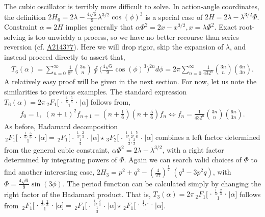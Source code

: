 \documentclass[nofootinbib,preprint]{revtex4-1}
\newcommand{\tFoIn}[3]{\,_2F_1 \Big[ 
\genfrac..{0pt}{}{#1}{#2}\Big| #3 \Big]}
\begin{document}
The cubic oscillator is terribly more difficult to solve. In action-angle coordinates, the 
definition $2H_6= 2\lambda -\frac{4\sqrt{6}}{9}\lambda^{3/2} \cos(\phi)^3$  is a 
special case of $2H= 2\lambda -\lambda^{3/2}\Phi$. Constraint $\alpha=2H$ implies generally 
that $\alpha \Phi^2 = 2x - x^{3/2}, x=\lambda\Phi^2$. Exact root-solving is too unwieldy 
a process, so we have no better recourse than series reversion 
(cf. \href{https://oeis.org/A214377}{A214377}). Here we will drop rigor, 
skip the expansion of $\lambda$, and instead proceed directly to assert that,
\begin{eqnarray}
T_6(\alpha)=  \sum_{n=0}^{\infty}\frac{1}{8^n}\binom{3n}{n}\oint\bigg(\frac{4\sqrt{6}}{9} \cos(\phi)^3 \bigg)^{2n} d\phi
= 2\pi \sum_{n=0}^{\infty}\frac{1}{432^{n}}\binom{3n}{n}\binom{6n}{3n}. \nonumber 
\end{eqnarray}
A relatively easy proof will be given in the next section. For now, let us note the similarities
to previous examples. The standard expression $T_6(\alpha) = 2\pi\tFoIn{\frac{1}{6},\frac{5}{6}}{1}{\alpha}$ 
follows from, 
\begin{eqnarray}
f_0=1, \; (n+1)^2 f_{n+1} = (n+\tfrac{1}{6})(n+\tfrac{5}{6})f_n
\iff f_n = \frac{1}{432^{n}}\binom{3n}{n}\binom{6n}{3n}.\nonumber 
\end{eqnarray}
As before, Hadamard decomposition
$\tFoIn{\frac{1}{6},\frac{5}{6}}{1}{\alpha}=
\tFoIn{\frac{1}{3},\frac{2}{3}}{\frac{1}{2}}{\alpha}
\star \,_3F_2 \Big[ 
\genfrac..{0pt}{}{\frac{1}{6},\frac{1}{2},\frac{5}{6}}{\frac{1}{3},\frac{2}{3}}\Big| \alpha \Big]$
combines a left factor determined from the general cubic constraint, $\alpha \Phi^2=2\lambda -\lambda^{3/2}$,
with a right factor determined by integrating powers of $\Phi$. Again we can search valid
choices of $\Phi$ to find another interesting case, $2H_3=p^2+q^2-(\frac{4}{27})^{\frac{1}{2}} \; ( q^3-3 p^2 q)$,
with $\Phi=\frac{4\sqrt{6}}{9}\sin(3\phi)$. The period function can be calculated simply by changing 
the right factor of the Hadamard product. That is,  
$T_3(\alpha)=2\pi\tFoIn{\frac{1}{3},\frac{2}{3}}{1}{\alpha}$ follows from 
$\tFoIn{\frac{1}{3},\frac{2}{3}}{1}{\alpha}=
\tFoIn{\frac{1}{3},\frac{2}{3}}{\frac{1}{2}}{\alpha}
\star \tFoIn{\frac{1}{2},\cdot}{\cdot}{\alpha}$.
\end{document}
